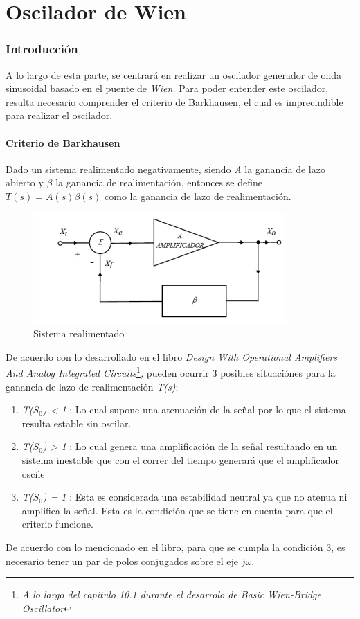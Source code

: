 \part{Oscilador de Wien}


\section{Introducción}

A lo largo de esta parte, se centrará en realizar un oscilador generador
de onda sinusoidal basado en el puente de \emph{Wien.} Para poder
entender este oscilador, resulta necesario comprender el criterio
de Barkhausen, el cual es imprecindible para realizar el oscilador.

\subsection{Criterio de Barkhausen}

Dado un sistema realimentado negativamente, siendo \emph{A }la ganancia
de lazo abierto y $\beta$ la ganancia de realimentación, entonces
se define $T(s)=A(s)\beta(s)$ como la ganancia de lazo de realimentación.

\begin{figure}[H]
\begin{centering}
\includegraphics{../Ex1/Resources/Realimentado}
\par\end{centering}
\caption{Sistema realimentado}

\end{figure}

De acuerdo con lo desarrollado en el libro \emph{Design With Operational
Amplifiers And Analog Integrated Circuits}\footnote{\emph{A lo largo del capitulo 10.1 durante el desarrolo de Basic Wien-Bridge
Oscillator}}\emph{, }pueden ocurrir 3 posibles situaciónes para la ganancia de
lazo de realimentación \emph{T(s)}:
\begin{enumerate}
\item \emph{T($S_{0}$) < 1} : Lo cual supone una atenuación de la señal
por lo que el sistema resulta estable sin oscilar.
\item \emph{T($S_{0}$) > 1} : Lo cual genera una amplificación de la señal
resultando en un sistema inestable que con el correr del tiempo generará
que el amplificador oscile
\item \emph{T($S_{0}$) = 1} : Esta es considerada una estabilidad neutral
ya que no atenua ni amplifica la señal. Esta es la condición que se
tiene en cuenta para que el criterio funcione.
\end{enumerate}
De acuerdo con lo mencionado en el libro, para que se cumpla la condición
3, es necesario tener un par de polos conjugados sobre el eje $j\omega$.

